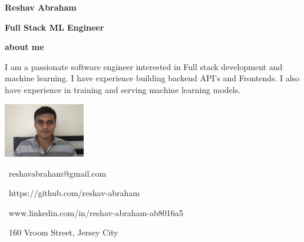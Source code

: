 \documentclass{article}
\begin{document}
    \begin{minipage}[t]{5.5in\linewidth}
    \Huge\vspace{0in}\hspace{-0.30em}\textbf{Reshav Abraham}  

    \vspace{0em}\hspace{-0.2em}\Large\textbf{Full Stack ML Engineer} 

    \vspace{0.5em}\hspace{0em}\small\textbf{about me} 

        \begin{minipage}[t]{0.6\textwidth\hspace{0em}}
        I am a passionate software engineer interested in Full stack development
        and machine learning. I have experience building backend API's and Frontends. I also have experience in training and serving machine learning models. \par
        \end{minipage}
    \end{minipage}
    \begin{minipage}[t]{3in\linewidth\hspace{-3em}}
        \small
        \strut\vspace*{-\baselineskip}\newline\includegraphics[width=1.4in]{reshav}
        
        \vspace{0.5em}
        \faEnvelopeO \, reshavabraham@gmail.com
        
        \faGithub\hspace \, https://github.com/reshav-abraham 

        \faLinkedin \, www.linkedin.com/in/reshav-abraham-ab8016a5

        \faHome \, 160 Vroom Street, Jersey City
    \end{minipage}

\vspace{1.3em}
\end{document}

